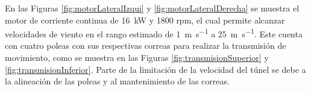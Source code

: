 En las Figuras \ref{fig:motorLateralIzqui} y \ref{fig:motorLateralDerecha} se muestra el motor de corriente continua de \SI{16}{\kilo\watt} y 1800 rpm, el cual permite alcanzar velocidades de viento en el rango estimado de \SI{1}{\meter\per\second} a \SI{25}{\meter\per\second}. Este cuenta con cuatro poleas con sus respectivas correas para realizar la transmisión de movimiento, como se muestra en las Figuras \ref{fig:transmisionSuperior} y \ref{fig:transmisionInferior}. Parte de la limitación de la velocidad del túnel se debe a la alineación de las poleas y al mantenimiento de las correas.



\begin{figure}[H]
    \centering
    \begin{minipage}{0.3\textwidth}
        \centering

\end{minipage}
\end{figure}
